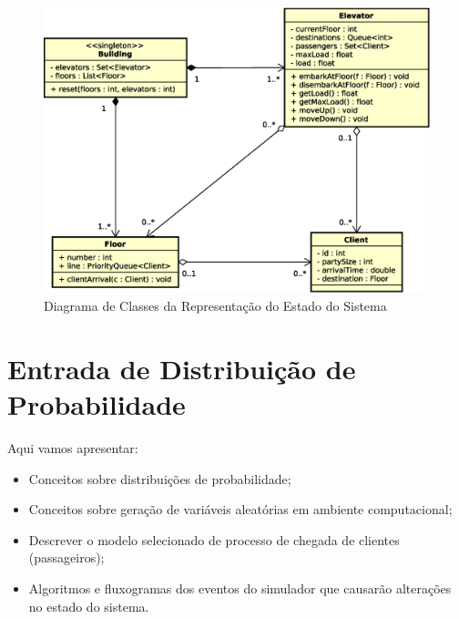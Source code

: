 \begin{figure}[htb!]
  \centering
  \includegraphics[scale=0.6]{img/system_diagram.eps}
  \caption{Diagrama de Classes da Representação do Estado do Sistema}
\label{fig:diagram:system}
\end{figure}

\section{\label{chap:input}Entrada de Distribuição de Probabilidade}

Aqui vamos apresentar:

\begin{itemize}
\item Conceitos sobre distribuições de probabilidade;
\item Conceitos sobre geração de variáveis aleatórias em ambiente computacional;
\item Descrever o modelo selecionado de processo de chegada de clientes
(passageiros);
\item Algoritmos e fluxogramas dos eventos do simulador que causarão alterações
no estado do sistema.
\end{itemize}
